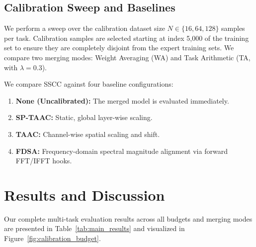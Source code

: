 \documentclass{article}
\theoremstyle{plain}
\theoremstyle{definition}
\theoremstyle{remark}
\begin{document}
\subsection{Calibration Sweep and Baselines}
We perform a sweep over the calibration dataset size $N \in \{16, 64, 128\}$ samples per task. Calibration samples are selected starting at index 5,000 of the training set to ensure they are completely disjoint from the expert training sets. We compare two merging modes: Weight Averaging (WA) and Task Arithmetic (TA, with $\lambda = 0.3$).

We compare SSCC against four baseline configurations:
\begin{enumerate}
    \item \textbf{None (Uncalibrated):} The merged model is evaluated immediately.
    \item \textbf{SP-TAAC:} Static, global layer-wise scaling.
    \item \textbf{TAAC:} Channel-wise spatial scaling and shift.
    \item \textbf{FDSA:} Frequency-domain spectral magnitude alignment via forward FFT/IFFT hooks.
\end{enumerate}

\section{Results and Discussion}
\label{submission-results}

Our complete multi-task evaluation results across all budgets and merging modes are presented in Table~\ref{tab:main_results} and visualized in Figure~\ref{fig:calibration_budget}.
\end{document}
